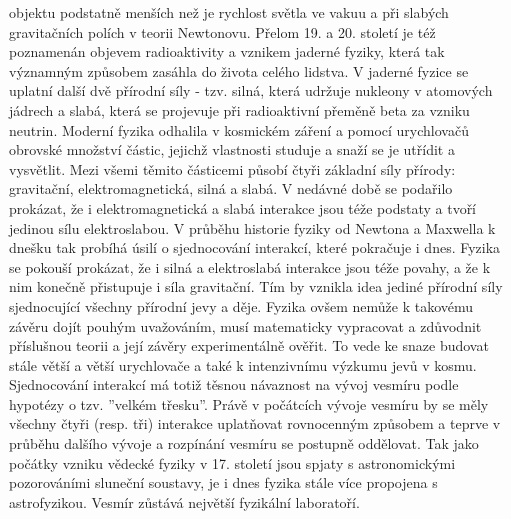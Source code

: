     objektu podstatně menších než je rychlost světla ve vakuu a při slabých gravitačních polích v
    teorii Newtonovu. Přelom 19. a 20. století je též poznamenán objevem radioaktivity a vznikem
    jaderné fyziky, která tak významným způsobem zasáhla do života celého lidstva. V jaderné fyzice
    se uplatní další dvě přírodní síly - tzv. silná, která udržuje nukleony v atomových jádrech a
    slabá, která se projevuje při radioaktivní přeměně beta za vzniku neutrin. Moderní fyzika
    odhalila v kosmickém záření a pomocí urychlovačů obrovské množství částic, jejichž vlastnosti
    studuje a snaží se je utřídit a vysvětlit. Mezi všemi těmito částicemi působí čtyři základní
    síly přírody: gravitační, elektromagnetická, silná a slabá. V nedávné době se podařilo prokázat,
    že i elektromagnetická a slabá interakce jsou téže podstaty a tvoří jedinou sílu elektroslabou.
    V průběhu historie fyziky od Newtona a Maxwella k dnešku tak probíhá úsilí o sjednocování
    interakcí, které pokračuje i dnes. Fyzika se pokouší prokázat, že i silná a elektroslabá
    interakce jsou téže povahy, a že k nim konečně přistupuje i síla gravitační. Tím by vznikla idea
    jediné přírodní síly sjednocující všechny přírodní jevy a děje. Fyzika ovšem nemůže k takovému
    závěru dojít pouhým uvažováním, musí matematicky vypracovat a zdůvodnit příslušnou teorii a její
    závěry experimentálně ověřit. To vede ke snaze budovat stále větší a větší urychlovače a také k
    intenzivnímu výzkumu jevů v kosmu. Sjednocování interakcí má totiž těsnou návaznost na vývoj
    vesmíru podle hypotézy o tzv. ”velkém třesku”. Právě v počátcích vývoje vesmíru by se měly
    všechny čtyři (resp. tři) interakce uplatňovat rovnocenným způsobem a teprve v průběhu dalšího
    vývoje a rozpínání vesmíru se postupně oddělovat. Tak jako počátky vzniku vědecké fyziky v 17.
    století jsou spjaty s astronomickými pozorováními sluneční soustavy, je i dnes fyzika stále více
    propojena s astrofyzikou. Vesmír zůstává největší fyzikální laboratoří.
  

